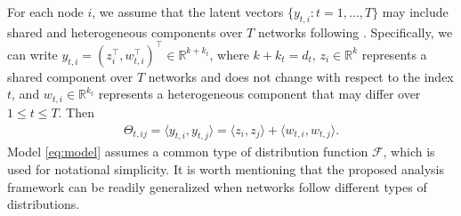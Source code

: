 \documentclass[12pt]{article}
\newcommand{\red}[1]{\textcolor{red}{#1}}
\newcommand{\mytrans}{\top}
\begin{document}
For each node $i$, we assume that the latent vectors $\{y_{t,i}:t=1,\ldots,T\}$ may 
include shared and heterogeneous components over $T$ networks following  \cite{macdonald2022latent}. Specifically, we can write  $y_{t,i}=(z_i^{\top}, w_{t,i}^{\top})^{\top} \in \mathbb{R}^{k+k_t}$, 
where
$k+k_t=d_t$, 
$z_i\in \mathbb{R}^k$  represents a shared component over $T$ networks and  does not change with respect to the index $t$, and $w_{t,i}\in \mathbb{R}^{k_t}$ represents a heterogeneous component that may differ over $1\leqslant t\leqslant T$. Then 
\begin{align}\label{eq:modeltheta}
    \Theta_{t,ij}=\langle y_{t,i},y_{t,j} \rangle = \langle z_i, z_j\rangle + \langle w_{t,i}, w_{t,j}\rangle.  
\end{align} 
Model \eqref{eq:model} assumes a common type of distribution function $\mathcal{F}$, which is used for notational simplicity. It is worth mentioning  that the proposed analysis framework can be readily generalized when networks follow different types of distributions.   


 
\end{document}
